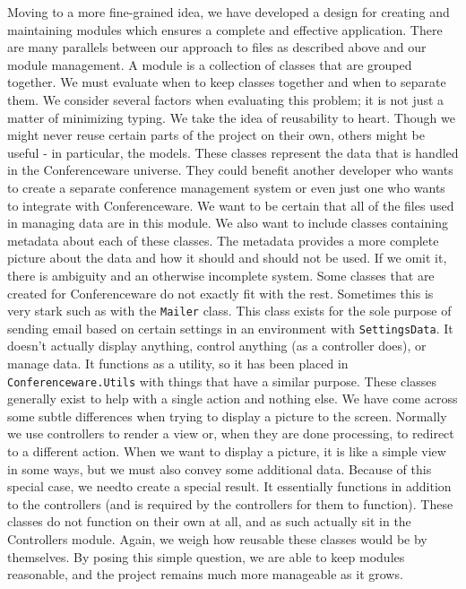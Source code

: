 \documentclass[12pt]{article}
\begin{document}
Moving to a more fine-grained idea, we have developed a design for creating and maintaining modules which ensures a complete and effective application. There are many parallels between our approach to files as described above and our module management. A module is a collection of classes that are grouped together. We must evaluate when to keep classes together and when to separate them.  We consider several factors when evaluating this problem; it is not just a matter of minimizing typing. We take the idea of reusability to heart. Though we might never reuse certain parts of the project on their own, others might be useful - in particular, the models. These classes represent the data that is handled in the Conferenceware universe. They could benefit another developer who wants to create a separate conference management system or even just one who wants to integrate with Conferenceware. We want to be certain that all of the files used in managing data are in this module. We also want to include classes containing metadata about each of these classes. The metadata provides a more complete picture about the data and how it should and should not be used. If we omit it, there is ambiguity and an otherwise incomplete system. Some classes that are created for Conferenceware do not exactly fit with the rest. Sometimes this is very stark such as with the \texttt{Mailer} class. This class exists for the sole purpose of sending email based on certain settings in an environment with \texttt{SettingsData}. It doesn't actually display anything, control anything (as a controller does), or manage data. It functions as a utility, so it has been placed in \texttt{Conferenceware.Utils} with things that have a similar purpose. These classes generally exist to help with a single action and nothing else. We have come across some subtle differences when trying to display a picture to the screen. Normally we use controllers to render a view or, when they are done processing, to redirect to a different action. When we want to display a picture, it is like a simple view in some ways, but we must also convey some additional data. Because of this special case, we needto create a special result. It essentially functions in addition to the controllers (and is required by the controllers for them to function). These classes do not function on their own at all, and as such actually sit in the Controllers module. Again, we weigh how reusable these classes would be by themselves. By posing this simple question, we are able to keep modules reasonable, and the project remains much more manageable as it grows.
\end{document}
